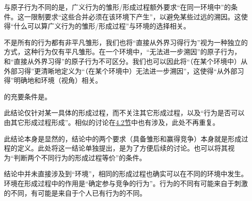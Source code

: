 \begin{explain}
与原子行为不同的是，广义行为的雏形/形成过程额外要求“在同一环境中”的条件。这一限制要求“这些合并必须在该环境下产生”，以避免某些过远的溯因。这使得“什么可以算广义行为的雏形/形成过程”与环境的选择相关。

不是所有的行为都有非平凡雏形，我们也将“直接从外界习得行为”视为一种独立的方式，这种行为仅有平凡雏形。在一个环境中，“无法进一步溯因”的原子行为，和“直接从外界习得”的原子行为不可区分。我们也可以因此将“（在某个环境中）从外部习得”更清晰地定义为“（在某个环境中）无法进一步溯因”，这使得“从外部习得”明确地和环境（视角）相关。
\end{explain}
的充要条件是。
\begin{explain}
此结论仅针对某一具体的形成过程，而不关注其它形成过程，以及“行为是否可以由其它形成过程形成”。相似的讨论在\hyperref[sec:有效沟通的必要篇幅]{4.2节}中也有涉及，此处不再重复。

此结论本身是显然的，结论中的两个要求（具备雏形和赢得竞争）本身就是形成过程的定义。此处将这一结论单独提出，是为了方便后续的讨论。\trained 也可以将其视为“判断两个不同行为的形成过程等价”的条件。

结论中并未直接涉及到“环境”，相同的形成过程也确实可以在不同的环境中发生。环境在形成过程中的作用是“确定参与竞争的行为”。行为的不同有可能来自于刺激的不同，有可能是来自于个人已有行为的不同。
\end{explain}

